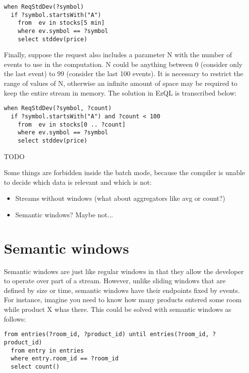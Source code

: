 \documentclass{report}
\begin{document}
\begin{verbatim}
when ReqStdDev(?symbol)
  if ?symbol.startsWith("A")
    from  ev in stocks[5 min]
    where ev.symbol == ?symbol
    select stddev(price)
\end{verbatim}

Finally, suppose the request also includes a parameter N with the
number of events to use in the computation. N could be anything
between 0 (consider only the last event) to 99 (consider the last 100
events). It is necessary to restrict the range of values of N,
otherwise an infinite amount of space may be required to keep the
entire stream in memory. The solution in EzQL is transcribed below:

\begin{verbatim}
when ReqStdDev(?symbol, ?count)
  if ?symbol.startsWith("A") and ?count < 100
    from  ev in stocks[0 .. ?count]
    where ev.symbol == ?symbol
    select stddev(price)
\end{verbatim}


TODO

Some things are forbidden inside the batch mode, because the compiler
is unable to decide which data is relevant and which is not:

\begin{itemize}
\item Streams without windows (what about aggregators like avg or count?)
\item Semantic windows? Maybe not...
\end{itemize}

\chapter{Semantic windows}

Semantic windows are just like regular windows in that they allow the
developer to operate over part of a stream. However, unlike sliding
windows that are defined by size or time, semantic windows have their
endpoints fixed by events. For instance, imagine you need to know how
many products entered some room while product X whas there. This could
be solved with semantic windows as follows:

\begin{verbatim}
from entries(?room_id, ?product_id) until entries(?room_id, ?product_id)
  from entry in entries
  where entry.room_id == ?room_id
  select count()
\end{verbatim}
\end{document}
